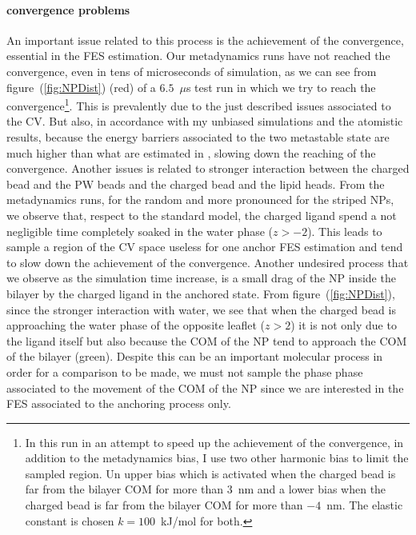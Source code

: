 \paragraph{\textbf{convergence problems}} An important issue related to this process is the achievement of the convergence, essential in the \ac{FES} estimation. Our metadynamics runs have not reached the convergence, even in tens of microseconds of simulation, as we can see from figure~(\ref{fig:NPDist}) (red) of a $6.5$~$\mu$s test run in which we try to reach the convergence\footnote{In this run in an attempt to speed up the achievement of the convergence, in addition to the metadynamics bias, I use two other harmonic bias to limit the sampled region. Un upper bias which is activated when the charged bead is far from the bilayer \acs{COM} for more than $3$~nm and a lower bias when the charged bead is far from the bilayer \acs{COM} for more than $-4$~nm. The elastic constant is chosen $k = 100$~kJ/mol for both.}. This is prevalently due to the just described issues associated to the \ac{CV}. But also, in accordance with my unbiased simulations and the atomistic results, because the energy barriers associated to the two metastable state are much higher than what are estimated in \cite{ourPaper}, slowing down the reaching of the convergence. Another issues is related to stronger interaction between the charged bead and the \ac{PW} beads and the charged bead and the lipid heads. From the metadynamics runs, for the random and more pronounced for the striped \acp{NP}, we observe that, respect to the standard \martini model, the charged ligand spend a not negligible time completely soaked in the water phase ($z>-2$). This leads to sample a region of the \ac{CV} space useless for one anchor \ac{FES} estimation and tend to slow down the achievement of the convergence. Another undesired process that we observe as the simulation time increase, is a small drag of the \ac{NP} inside the bilayer by the charged ligand in the anchored state. From figure~(\ref{fig:NPDist}), since the stronger interaction with water, we see that when the charged bead is approaching the water phase of the opposite leaflet ($z>2$) it is not only due to the ligand itself but also because the \ac{COM} of the \ac{NP} tend to approach the \ac{COM} of the bilayer (green). Despite this can be an important molecular process in order for a comparison to be made, we must not sample the phase phase associated to the movement of the \ac{COM} of the \ac{NP} since we are interested in the \ac{FES} associated to the anchoring process only.

